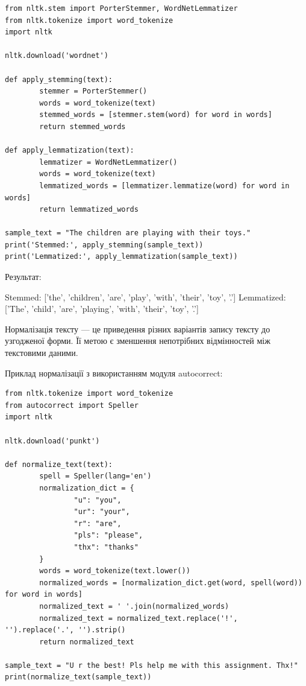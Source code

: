 \begin{lstlisting}
from nltk.stem import PorterStemmer, WordNetLemmatizer
from nltk.tokenize import word_tokenize
import nltk

nltk.download('wordnet')

def apply_stemming(text):
        stemmer = PorterStemmer()
        words = word_tokenize(text)
        stemmed_words = [stemmer.stem(word) for word in words]
        return stemmed_words

def apply_lemmatization(text):
        lemmatizer = WordNetLemmatizer()
        words = word_tokenize(text)
        lemmatized_words = [lemmatizer.lemmatize(word) for word in words]
        return lemmatized_words

sample_text = "The children are playing with their toys."
print('Stemmed:', apply_stemming(sample_text))
print('Lemmatized:', apply_lemmatization(sample_text))
\end{lstlisting}

Результат:

\begin{console}
Stemmed: ['the', 'children', 'are', 'play', 'with', 'their', 'toy', '.']
Lemmatized: ['The', 'child', 'are', 'playing', 'with', 'their', 'toy', '.']
\end{console}

Нормалізація тексту — це приведення різних варіантів запису тексту до узгодженої форми. Її метою є зменшення непотрібних відмінностей між текстовими даними.

Приклад нормалізації з використанням модуля autocorrect:

\begin{lstlisting}
from nltk.tokenize import word_tokenize
from autocorrect import Speller
import nltk

nltk.download('punkt')

def normalize_text(text):
        spell = Speller(lang='en')
        normalization_dict = {
                "u": "you",
                "ur": "your",
                "r": "are",
                "pls": "please",
                "thx": "thanks"
        }
        words = word_tokenize(text.lower())
        normalized_words = [normalization_dict.get(word, spell(word)) for word in words]
        normalized_text = ' '.join(normalized_words)
        normalized_text = normalized_text.replace('!', '').replace('.', '').strip()
        return normalized_text

sample_text = "U r the best! Pls help me with this assignment. Thx!"
print(normalize_text(sample_text))
\end{lstlisting}


